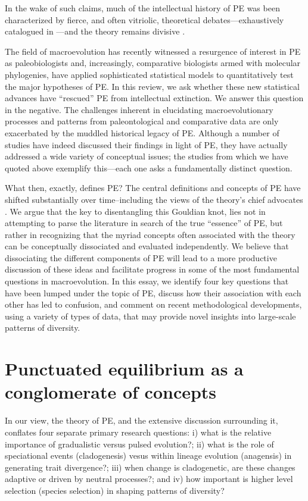 In the wake of such claims, much of the intellectual history of PE was been characterized by fierce, and often vitriolic, theoretical debates---exhaustively catalogued in \citep{Levinton2001, Gould2002}---and the theory remains divisive \citep[for more on the history of the idea, see][]{Sepkoskibook}.

The field of macroevolution has recently witnessed a resurgence of interest in PE as paleobiologists and, increasingly, comparative biologists armed with molecular phylogenies, have applied sophisticated statistical models to quantitatively test the major hypotheses of PE. In this review, we ask whether these new statistical advances have ``rescued'' PE from intellectual extinction. We answer this question in the negative. The challenges inherent in elucidating macroevolutionary processes and patterns from paleontological and comparative data are only exacerbated by the muddled historical legacy of PE. Although a number of studies have indeed discussed their findings in light of PE, they have actually addressed a wide variety of conceptual issues; the studies from which we have quoted above exemplify this---each one asks a fundamentally distinct question.

What then, exactly, defines PE? The central definitions and concepts of PE have shifted substantially over time--including the views of the theory's chief advocates \citep{Mayr1982, Ruse1989, Sepkoskibook}. We argue that the key to disentangling this Gouldian knot, lies not in attempting to parse the literature in search of the true ``essence'' of PE, but rather in recognizing that the myriad concepts often associated with the theory can be conceptually dissociated and evaluated independently. We believe that dissociating the different components of PE will lead to a more productive discussion of these ideas and facilitate progress in some of the most fundamental questions in macroevolution. In this essay, we identify four key questions that have been lumped under the topic of PE, discuss how their association with each other has led to confusion, and comment on recent methodological developments, using a variety of types of data, that may provide novel insights into large-scale patterns of diversity.

\section{Punctuated equilibrium as a conglomerate of concepts}

In our view, the theory of PE, and the extensive discussion surrounding it, conflates four separate primary research questions: i) what is the relative importance of gradualistic versus pulsed evolution?; ii) what is the role of speciational events (cladogenesis) vesus within lineage evolution (anagensis) in generating trait divergence?; iii) when change is cladogenetic, are these changes adaptive or driven by neutral processes?; and iv) how important is higher level selection (species selection) in shaping patterns of diversity? 


